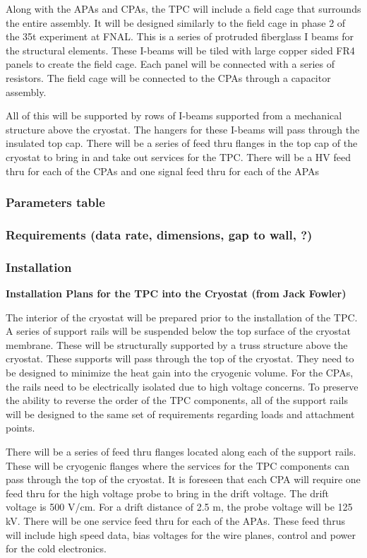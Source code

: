 Along with the APAs and CPAs, the TPC will include a field cage that surrounds the entire assembly.  It will 
be designed similarly to the field cage in phase 2 of the 35t experiment at FNAL.  This is a series of 
protruded fiberglass I beams for the structural elements.  These I-beams will be tiled with large copper 
sided FR4 panels to create the field cage.  Each panel will be connected with a series of resistors.  The field 
cage will be connected to the CPAs through a capacitor assembly.

All of this will be supported by rows of I-beams supported from a mechanical structure above the cryostat.  
The hangers for these I-beams will pass through the insulated top cap.  There will be a series of feed thru 
flanges in the top cap of the cryostat to bring in and take out services for the TPC.  There will be a HV feed 
thru for each of the CPAs and one signal feed thru for each of the APAs



\subsubsection{Parameters table}
\subsubsection{Requirements (data rate, dimensions, gap to wall,  ?)}
\subsubsection{Installation}

\textbf{Installation Plans for the TPC into the Cryostat  (from Jack Fowler)}

The interior of the cryostat will be prepared prior to the installation of the TPC.  A series of support rails 
will be suspended below the top surface of the cryostat membrane.  These will be structurally supported 
by a truss structure above the cryostat.  These supports will pass through the top of the cryostat.  They 
need to be designed to minimize the heat gain into the cryogenic volume.  For the CPAs, the rails need to 
be electrically isolated due to high voltage concerns.  To preserve the ability to reverse the order of the 
TPC components, all of the support rails will be designed to the same set of requirements regarding 
loads and attachment points.  

There will be a series of feed thru flanges located along each of the support rails.  These will be cryogenic 
flanges where the services for the TPC components can pass through the top of the cryostat.  It is 
foreseen that each CPA will require one feed thru for the high voltage probe to bring in the drift voltage.  
The drift voltage is 500 V/cm.  For a drift distance of 2.5 m, the probe voltage will be 125 kV.  There will 
be one service feed thru for each of the APAs.  These feed thrus will include high speed data, bias 
voltages for the wire planes, control and power for the cold electronics.  

